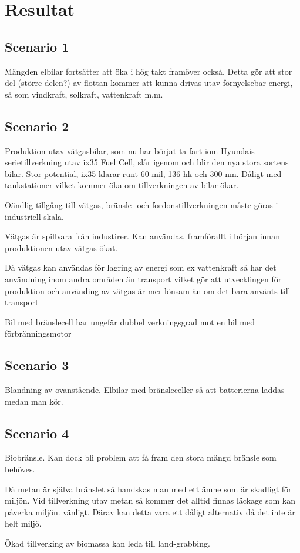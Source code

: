 \documentclass[a4paper,11pt,fleqn, titlepage]{article}
\begin{document}
\section{Resultat}

\subsection{Scenario 1}

Mängden elbilar fortsätter att öka i hög takt framöver också. Detta gör att stor del (större delen?) av flottan kommer att kunna drivas utav förnyelsebar energi, så som vindkraft, solkraft, vattenkraft m.m.


\subsection{Scenario 2}

Produktion utav vätgasbilar, som nu har börjat ta fart iom Hyundais serietillverkning utav ix35 Fuel Cell, slår igenom och blir den nya stora sortens bilar. Stor potential, ix35 klarar runt 60 mil, 136 hk och 300 nm. Dåligt med tankstationer vilket kommer öka om tillverkningen av bilar ökar.

Oändlig tillgång till vätgas, bränsle- och fordonstillverkningen måste göras i industriell skala.

Vätgas är spillvara från industirer. Kan användas, framförallt i början innan produktionen utav vätgas ökat.

Då vätgas kan användas för lagring av energi som ex vattenkraft så har det användning inom andra områden än transport vilket gör att utvecklingen för produktion och använding av vätgas är mer lönsam än om det bara använts till transport

Bil med bränslecell har ungefär dubbel verkningsgrad mot en bil med förbränningsmotor




\subsection{Scenario 3}

Blandning av ovanstående.
Elbilar med bränsleceller så att batterierna laddas medan man kör.

\subsection{Scenario 4}

Biobränsle. Kan dock bli problem att få fram den stora mängd bränsle som behöves.

Då metan är själva bränslet så handskas man med ett ämne som är skadligt för miljön. Vid tillverkning utav metan så kommer det alltid finnas läckage som kan påverka miljön. vänligt. Därav kan detta vara ett dåligt alternativ då det inte är helt miljö.

Ökad tillverking av biomassa kan leda till land-grabbing.
\end{document}

